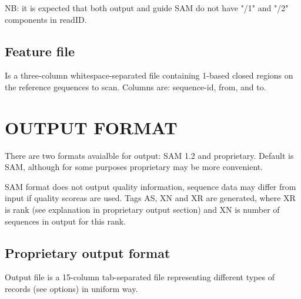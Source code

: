 \documentclass[english,letter]{article}
\begin{document}
    NB: it is expected that both output and guide SAM do not have "/1"
        and "/2" components in readID.

\subsection{Feature file}
    Is a three-column whitespace-separated file containing 1-based closed
    regions on the reference gequences to scan. 
    Columns are: sequence-id, from, and to.

\section{OUTPUT FORMAT}
    There are two formats avaialble for output: SAM 1.2 and 
    proprietary. Default is SAM, although for some purposes proprietary 
    may be more convenient.

    SAM format does not output quality information, sequence data may differ
    from input if quality scoreas are used. Tags AS, XN and XR are generated,
    where XR is rank (see explanation in proprietary output section) and XN is
    number of sequences in output for this rank.

\subsection{Proprietary output format}
    Output file is a 15-column tab-separated file representing different types
    of records (see  options) in uniform way. 
\end{document}

